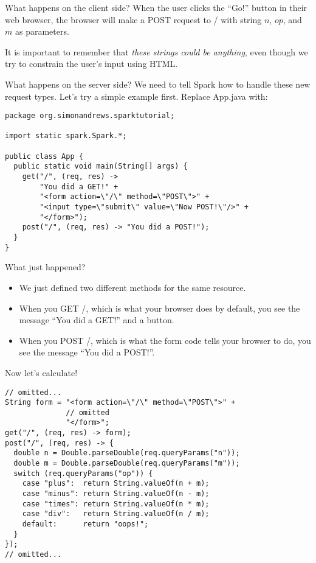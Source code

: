 \begin{frame}{What happens on the client side?}
When the user clicks the ``Go!'' button in their web browser, the browser will make a POST request to / with string $n$, $op$, and $m$ as parameters.

It is important to remember that \textit{these strings could be anything}, even though we try to constrain the user's input using HTML.
\end{frame}

\begin{frame}[fragile]{What happens on the server side?}
We need to tell Spark how to handle these new request types. Let's try a simple example first. Replace App.java with:
\begin{verbatim}
package org.simonandrews.sparktutorial;

import static spark.Spark.*;

public class App {
  public static void main(String[] args) {
    get("/", (req, res) ->
        "You did a GET!" +
        "<form action=\"/\" method=\"POST\">" +
        "<input type=\"submit\" value=\"Now POST!\"/>" +
        "</form>");
    post("/", (req, res) -> "You did a POST!");
  }
}
\end{verbatim}
\end{frame}

\begin{frame}{What just happened?}
\begin{itemize}
    \item We just defined two different methods for the same resource.
    \item When you GET /, which is what your browser does by default, you see the message ``You did a GET!'' and a button.
    \item When you POST /, which is what the form code tells your browser to do, you see the message ``You did a POST!''.
\end{itemize}
\end{frame}

\begin{frame}[fragile]{Now let's calculate!}
\begin{verbatim}
// omitted...
String form = "<form action=\"/\" method=\"POST\">" +
              // omitted
              "</form>";
get("/", (req, res) -> form);
post("/", (req, res) -> {
  double n = Double.parseDouble(req.queryParams("n"));
  double m = Double.parseDouble(req.queryParams("m"));
  switch (req.queryParams("op")) {
    case "plus":  return String.valueOf(n + m);
    case "minus": return String.valueOf(n - m);
    case "times": return String.valueOf(n * m);
    case "div":   return String.valueOf(n / m);
    default:      return "oops!";
  }
});
// omitted...
\end{verbatim}
\end{frame}

